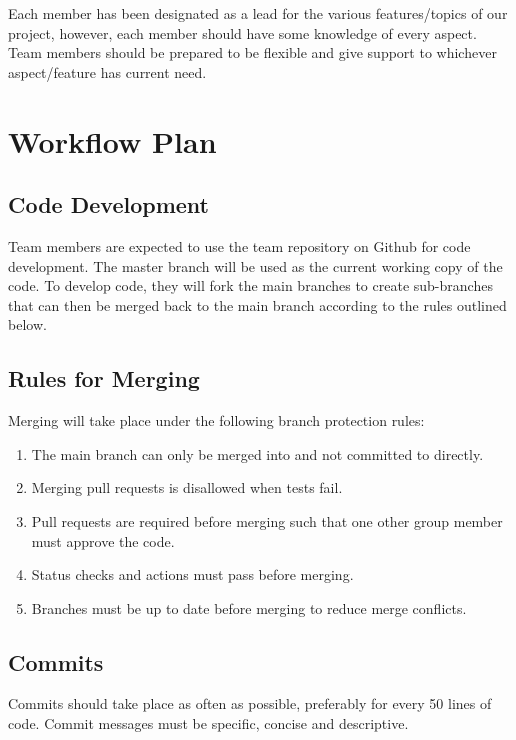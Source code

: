 \documentclass{article}
\begin{document}
Each member has been designated as a lead for the various features/topics of our project, however, each member should have some knowledge of every aspect.  Team members should be prepared to be flexible and give support to whichever aspect/feature has current need. 

\section{Workflow Plan}

\subsection{Code Development}

Team members are expected to use the team repository on Github for code development. The master branch will be used as the current working copy of the code. To develop code, they will fork the main branches to create sub-branches that can then be merged back to the main branch according to the rules outlined below. 

\subsection{Rules for Merging}

Merging will take place under the following branch protection rules: 

\begin{enumerate}

\item The main branch can only be merged into and not committed to directly. 
\item Merging pull requests is disallowed when tests fail. 
\item Pull requests are required before merging such that one other group member must approve the code. 
\item Status checks and actions must pass before merging. 
\item Branches must be up to date before merging to reduce merge conflicts. 

\end{enumerate} 

\subsection{Commits}

Commits should take place as often as possible, preferably for every 50 lines of code. Commit messages must be specific, concise and descriptive. 
\end{document}
